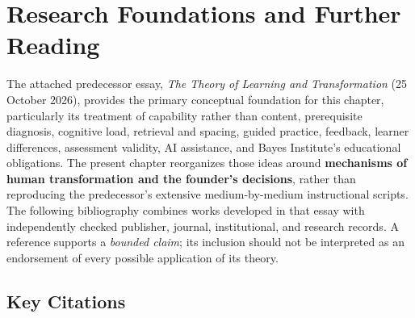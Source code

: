 \section*{Research Foundations and Further Reading}

The attached predecessor essay, \emph{The Theory of Learning and Transformation} (25 October 2026), provides the primary conceptual foundation for this chapter, particularly its treatment of capability rather than content, prerequisite diagnosis, cognitive load, retrieval and spacing, guided practice, feedback, learner differences, assessment validity, AI assistance, and Bayes Institute's educational obligations. The present chapter reorganizes those ideas around \textbf{mechanisms of human transformation and the founder's decisions}, rather than reproducing the predecessor's extensive medium-by-medium instructional scripts. The following bibliography combines works developed in that essay with independently checked publisher, journal, institutional, and research records. A reference supports a \emph{bounded claim}; its inclusion should not be interpreted as an endorsement of every possible application of its theory.

\subsection*{Key Citations}

